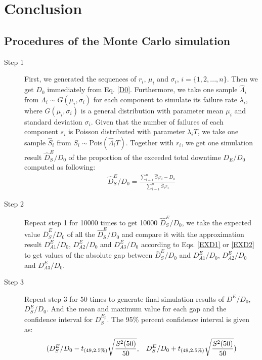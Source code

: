 \documentclass[preprint,12pt]{elsarticle}
\begin{document}
\section{Conclusion}
\newpage
\begin{appendices}


\section{Procedures of the Monte Carlo simulation}
\label{MCP}
\begin{description}
\item[Step 1]
First, we generated the sequences of $r_{i}$, $\mu_{i}$ and $\sigma_{i}$, $i=\{1,2,...,n\}$. Then we get $D_0$ immediately from Eq. \eqref{D0}. Furthermore, we take one sample $\hat{\Lambda}_{i}$ from $\Lambda_{i} \sim G(\mu_{i},\sigma_{i})$ for each component to simulate its failure rate $\lambda_{i}$, where $G(\mu_{i},\sigma_{i})$ is a general distribution with parameter mean $\mu_{i}$ and standard deviation $\sigma_{i}$. Given that the number of failures of each component $s_{i}$ is Poisson distributed with parameter $\lambda_{i}T$, we take one sample $\hat{S}_{i}$ from $S_{i}\sim$Pois$(\hat{\Lambda}_{i}T)$. Together with $r_{i}$, we get one simulation result $\hat{D}_{S}^{E}/D_{0}$ of the proportion of the exceeded total downtime $D_{E}/D_0$ computed as following:
\begin{eqnarray}
\hat{D}_{S}^{E}/D_{0}=\frac{\sum_{i=1}^{n}{\hat{S}_{i}r_{i}}-D_0}{\sum_{i=1}^{n}{\hat{S}_{i}r_{i}}}
\end{eqnarray}

\item[Step 2]

Repeat step 1 for 10000 times to get 10000 $\hat{D}_{S}^{E}/D_{0}$, we take the expected value $\bar{D}_{S}^{E}/D_{0}$ of all the $\hat{D}_{S}^{E}/D_{0}$ and compare it with the approximation result $D_{A1}^{E}/D_{0}$, $D_{A2}^{E}/D_{0}$ and $D_{A3}^{E}/D_{0}$ according to Eqs. \eqref{EXD1} or \eqref{EXD2}  to get values of the absolute gap between $\bar{D}_{S}^{E}/D_{0}$ and $D_{A1}^{E}/D_{0}$, $D_{A2}^{E}/D_{0}$ and $D_{A3}^{E}/D_{0}$.

\item[Step 3]

Repeat step 3 for 50 times to generate final simulation results of $D^{E}/D_{0}$, $D^{E}_{S}/D_{0}$. And the mean and maximum value for each gap and the confidence interval for $D^{E_{p}}_{S}$. The 95\% percent confidence interval is given as:
$$(D_{S}^{E}/D_{0}-t_{(49,2.5\%)}\sqrt{\frac{S^{2}(50)}{50}},\hspace{3mm}D_{S}^{E}/D_{0}+t_{(49,2.5\%)}\sqrt{\frac{S^{2}(50)}{50}} ) $$


\end{description}
\end{appendices}
\end{document}

